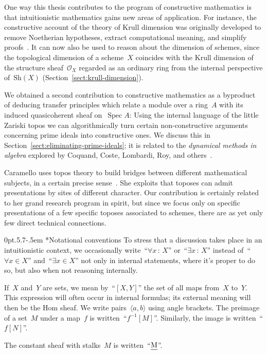 \documentclass[10pt,reqno,a4paper]{amsbook}
\makeatletter
\theoremstyle{definition}
\theoremstyle{plain}
\theoremstyle{remark}
\renewcommand{\O}{\mathcal{O}}
\let\oldul\ul
\renewcommand{\ul}[1]{\text{\oldul{$#1$}}}
\newcommand{\Sh}{\mathrm{Sh}}
\DeclareMathOperator{\Spec}{Spec}
\newcommand{\?}{\,{:}\,}
\renewcommand{\_}{\mathpunct{.}\,}
\def\subsection{\@startsection{subsection}{2}%
  {0pt}{.5\linespacing\@plus.7\linespacing}{-.5em}%
  {\normalfont\bfseries}}
\makeatother
\begin{document}
{One way this thesis contributes to the program of constructive
mathematics is that intuitionistic mathematics gains new areas of application.
For instance, the constructive account of the theory of Krull dimension was
originally developed to remove Noetherian hypotheses, extract computational meaning, and
simplify proofs~\cite{dyn:krull-integral,dyn:char-krull}. It can now also be used to
reason about the dimension of schemes, since the topological dimension of a
scheme~$X$ coincides with the Krull dimension of the structure sheaf~$\O_X$
regarded as an ordinary ring from the internal perspective of~$\Sh(X)$
(Section~\ref{sect:krull-dimension}).

We obtained a second contribution to constructive mathematics as a byproduct of
deducing transfer principles which relate a module over a ring~$A$ with its
induced quasicoherent sheaf on~$\Spec A$: Using the internal language of the
little Zariski topos we can algorithmically turn certain non-constructive
arguments concerning prime ideals into constructive ones. We discuss this in
Section~\ref{sect:eliminating-prime-ideals}; it is related to the
\emph{dynamical methods in algebra} explored by Coquand, Coste, Lombardi, Roy,
and others~\cite{clr:dynamicalmethod,cl:logical}.

Caramello uses topos theory to build bridges between different mathematical
subjects, in a certain precise sense~\cite{caramello:1,caramello:2}. She
exploits that toposes can admit presentations by sites of different character. Our
contribution is certainly related to her grand research program in spirit, but since we
focus only on specific presentations of a few specific toposes associated to
schemes, there are as yet only few direct technical connections.


\subsection*{Notational conventions} To stress that a discussion takes place in
an intuitionistic context, we occasionally write~``$\forall x\?X$''
or~``$\exists x\?X$'' instead of~``$\forall x \in X$'' and~``$\exists x \in
X$'' not only in internal statements, where it's proper to do so, but also when
not reasoning internally.

If~$X$ and~$Y$ are sets, we mean by~``$[X,Y]$'' the set of all maps from~$X$
to~$Y$. This expression will often occur in internal formulas; its external
meaning will then be the Hom sheaf. We write pairs~$\langle a, b \rangle$ using
angle brackets. The preimage of a set~$M$ under a map~$f$ is
written~``$f^{-1}[M]$''. Similarly, the image is written~``$f[N]$''.

The constant sheaf with stalks~$M$ is written~``$\ul{M}$''.

}
\end{document}
